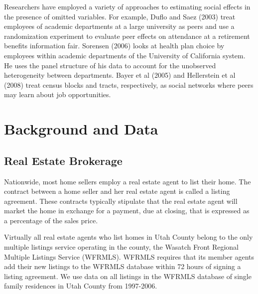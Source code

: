\documentclass[12pt]{article}
\begin{document}
    Researchers have employed a variety of approaches to estimating social effects in the presence of omitted variables. For example, Duflo and Saez (2003) treat employees of academic departments at a large university as peers and use a randomization experiment to evaluate peer effects on attendance at a retirement benefits information fair. Sorensen (2006) looks at health plan choice by employees within academic departments of the University of California system. He uses the panel structure of his data to account for the unobserved heterogeneity between departments.  Bayer et al (2005) and Hellerstein et al (2008) treat census blocks and tracts, respectively, as social networks where peers may learn  about job opportunities.
    
%
%
%
%    
%
%
%

\section{Background and Data}

\subsection*{Real Estate Brokerage}
    Nationwide, most home sellers employ a real estate agent to list their home. The contract between a home seller and her real estate agent is  called a listing agreement. These contracts typically stipulate that the real estate agent will market the home in exchange for a payment, due at  closing, that is expressed as a percentage of the sales price.

    Virtually all real estate agents who list homes in Utah County belong to the only multiple listings service operating in the county, the Wasatch  Front Regional Multiple Listings Service (WFRMLS).  WFRMLS requires that its member agents add their new listings to the WFRMLS database within 72 hours of signing a listing agreement. We use data on all listings in the WFRMLS database of single family residences in Utah County from 1997-2006.
\end{document}

